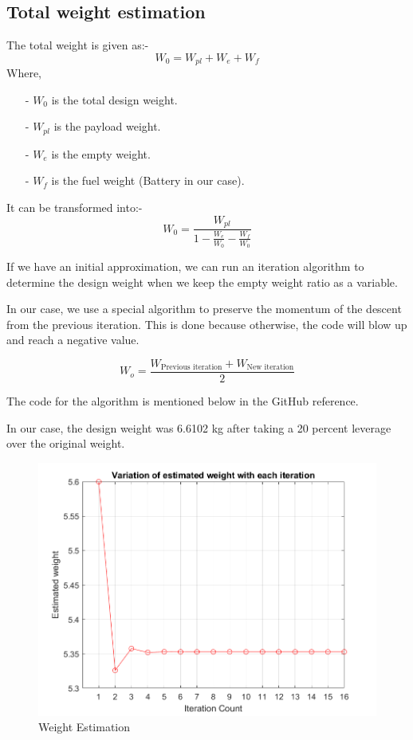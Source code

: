 \documentclass[12 pt]{article}
\begin{document}

\subsection{{Total weight estimation}}

The total weight is given as:- 
$$ W_0 = W_{pl} + W_{e} + W_{f} $$
Where,
\begin{itemize}
    \item[-] $W_0$ is the total design weight.
    \item [-] $W_{pl}$ is the payload weight.
    \item [-] $W_{e}$ is the empty weight.
    \item [-] $W_{f}$ is the fuel weight (Battery in our case).
\end{itemize}

It can be transformed into:- 
$$W_{0} = \frac{W_{pl}}{1 - \frac{W_{e}}{W_{0}} - \frac{W_{f}}{W_0}}$$

If we have an initial approximation, we can run an iteration algorithm to determine the design weight when we keep the empty weight ratio as a variable.


In our case, we use a special algorithm to preserve the momentum of the descent from the previous iteration. This is done because otherwise, the code will blow up and reach a negative value. 

$$ W_o = \frac{ W_{\text{Previous iteration}} + W_{\text{New iteration}} }{2} $$

The code for the algorithm is mentioned below in the GitHub reference.

In our case, the design weight was 6.6102 kg after taking a 20 percent leverage over the original weight.

\begin{figure}
    \centering
    \includegraphics[width=0.75\linewidth]{Codes/Week 2/weight.png}
    \caption{{Weight Estimation}}
    \label{Weight Estimation}
\end{figure}
\end{document}

